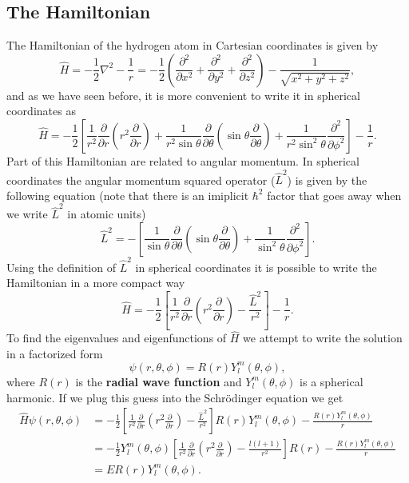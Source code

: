 \documentclass[../Main/chem331-notes.tex]{subfiles}
\begin{document}
\subsection{The Hamiltonian}
The Hamiltonian of the hydrogen atom in Cartesian coordinates is given by
\begin{equation}
\hat{H} = -\frac{1}{2} \nabla^2 - \frac{1}{r} = -\frac{1}{2} \left(\frac{\partial^2}{\partial x^2} + \frac{\partial^2}{\partial y^2} + \frac{\partial^2}{\partial z^2} \right) - \frac{1}{\sqrt{x^2 + y^2 + z^2}},
\end{equation}
and as we have seen before, it is more convenient to write it in spherical coordinates as
\begin{equation}
\hat{H} =  -\frac{1}{2} \left[ \frac{1}{r^2} \frac{\partial}{\partial r} \left( r^2 \frac{\partial }{\partial r} \right)
+ \frac{1}{r^2 \sin \theta} \frac{\partial}{\partial \theta} \left( \sin\theta \frac{\partial }{\partial \theta} \right)
+ \frac{1}{r^2 \sin^2 \theta} \frac{\partial^2}{\partial \phi^2} \right]  - \frac{1}{r}.
\end{equation}
Part of this Hamiltonian are related to angular momentum.
In spherical coordinates the angular momentum squared operator ($\hat{L}^2$) is given by the following equation (note that there is an imiplicit $\hbar^2$ factor that  goes away when we write $\hat{L}^2$ in atomic units)
\begin{equation}
\hat{L}^2 = - \left[\frac{1}{ \sin \theta} \frac{\partial}{\partial \theta} \left( \sin\theta \frac{\partial }{\partial \theta} \right)
+ \frac{1}{ \sin^2 \theta} \frac{\partial^2}{\partial \phi^2} \right].
\end{equation}
Using the definition of $\hat{L}^2$ in spherical coordinates it is possible to write the Hamiltonian in a more compact way
\begin{equation}
\hat{H} =  -\frac{1}{2} \left[ \frac{1}{r^2} \frac{\partial}{\partial r} \left( r^2 \frac{\partial }{\partial r} \right)
- \frac{\hat{L}^2}{r^2}  \right]  - \frac{1}{r}.
\end{equation}
To find the eigenvalues and eigenfunctions of $\hat{H}$ we attempt to write the solution in a factorized form
\begin{equation}
\psi(r,\theta,\phi) = R(r) Y_l^m(\theta,\phi),
\end{equation}
where $R(r)$ is the \textbf{radial wave function} and $Y_l^m(\theta,\phi)$ is a spherical harmonic.
If we plug this guess into the Schr\"{o}dinger equation we get
\begin{equation}
\begin{split}
\hat{H}\psi(r,\theta,\phi) & =  -\frac{1}{2} \left[ \frac{1}{r^2} \frac{\partial}{\partial r} \left( r^2 \frac{\partial }{\partial r} \right)
- \frac{\hat{L}^2}{r^2}  \right]R(r) Y_l^m(\theta,\phi)  - \frac{R(r) Y_l^m(\theta,\phi)}{r} \\
& = -\frac{1}{2} Y_l^m(\theta,\phi) \left[ \frac{1}{r^2} \frac{\partial}{\partial r} \left( r^2 \frac{\partial  }{\partial r} \right)
- \frac{l(l+1)}{r^2}  \right] R(r)  - \frac{R(r) Y_l^m(\theta,\phi)}{r} \\
& = E R(r) Y_l^m(\theta,\phi).
\end{split}
\end{equation}
\end{document}

